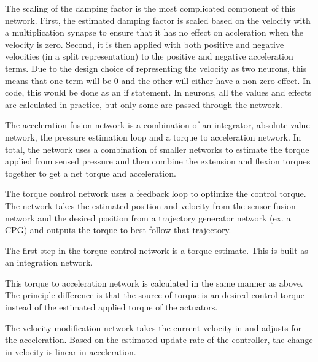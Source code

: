 
The scaling of the damping factor is the most complicated component of this
network. First, the estimated damping factor is scaled based on the velocity 
with a multiplication synapse to ensure that it has no effect on accleration
when the velocity is zero. Second, it is then applied with both positive and
negative velocities (in a split representation) to the positive and negative
acceleration terms. Due to the design choice of representing the velocity as two
neurons, this means that one term will be 0 and the other will either have a 
non-zero effect. In code, this would be done as an if statement. In neurons,
all the values and effects are calculated in practice, but only some are passed
through the network.



The acceleration fusion network is a combination of an integrator, absolute
value network, the pressure estimation loop and a torque to acceleration
network. In total, the network uses a combination of smaller networks to
estimate the torque applied from sensed pressure and then combine the extension
and flexion torques together to get a net torque and acceleration.


The torque control network uses a feedback loop to optimize the
control torque. The network takes the estimated position and velocity from the 
sensor fusion network and the desired position from a trajectory generator
network (ex. a CPG) and outputs the torque to best follow that trajectory.



The first step in the torque control network is a torque estimate. This is built
as an integration network.


This torque to acceleration network is calculated in the same manner as above.
The principle difference is that the source of torque is an desired control
torque instead of the estimated applied torque of the actuators.


The velocity modification network takes the current velocity in and adjusts for
the acceleration. Based on the estimated update rate of the controller, the
change in velocity is linear in acceleration.

